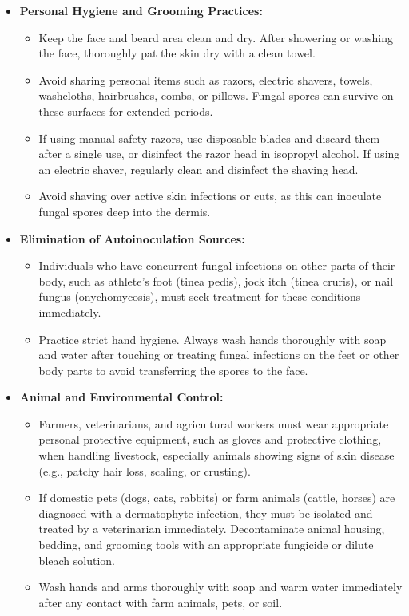 \begin{itemize}
    \item \textbf{Personal Hygiene and Grooming Practices:}
    \begin{itemize}
        \item Keep the face and beard area clean and dry. After showering or washing the face, thoroughly pat the skin dry with a clean towel.
        \item Avoid sharing personal items such as razors, electric shavers, towels, washcloths, hairbrushes, combs, or pillows. Fungal spores can survive on these surfaces for extended periods.
        \item If using manual safety razors, use disposable blades and discard them after a single use, or disinfect the razor head in isopropyl alcohol. If using an electric shaver, regularly clean and disinfect the shaving head.
        \item Avoid shaving over active skin infections or cuts, as this can inoculate fungal spores deep into the dermis.
    \end{itemize}
    \item \textbf{Elimination of Autoinoculation Sources:}
    \begin{itemize}
        \item Individuals who have concurrent fungal infections on other parts of their body, such as athlete's foot (tinea pedis), jock itch (tinea cruris), or nail fungus (onychomycosis), must seek treatment for these conditions immediately.
        \item Practice strict hand hygiene. Always wash hands thoroughly with soap and water after touching or treating fungal infections on the feet or other body parts to avoid transferring the spores to the face.
    \end{itemize}
    \item \textbf{Animal and Environmental Control:}
    \begin{itemize}
        \item Farmers, veterinarians, and agricultural workers must wear appropriate personal protective equipment, such as gloves and protective clothing, when handling livestock, especially animals showing signs of skin disease (e.g., patchy hair loss, scaling, or crusting).
        \item If domestic pets (dogs, cats, rabbits) or farm animals (cattle, horses) are diagnosed with a dermatophyte infection, they must be isolated and treated by a veterinarian immediately. Decontaminate animal housing, bedding, and grooming tools with an appropriate fungicide or dilute bleach solution.
        \item Wash hands and arms thoroughly with soap and warm water immediately after any contact with farm animals, pets, or soil.
    \end{itemize}
\end{itemize}


